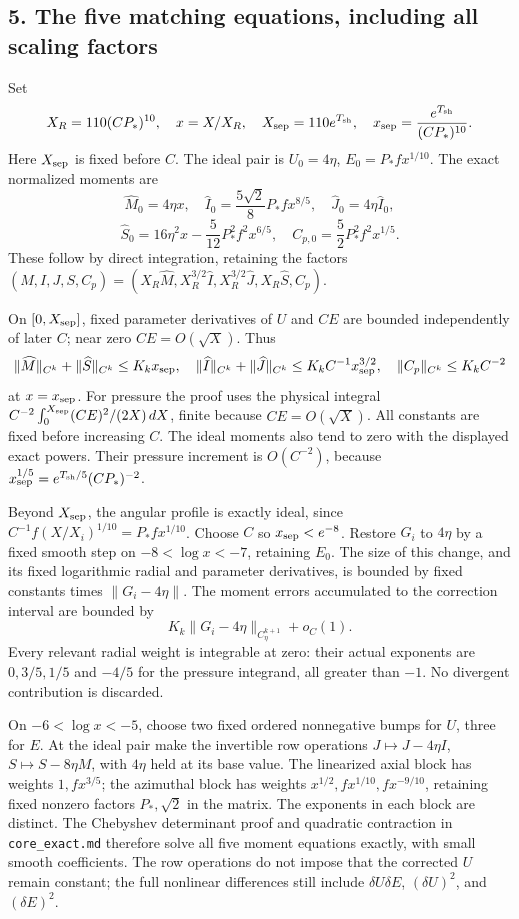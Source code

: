 \documentclass[10pt,a4paper]{article}
\begin{document}
\subsection{5. The five matching equations, including all scaling factors}

Set
\[
X_R=110(CP_*)^{10},\quad x=X/X_R,\quad
X_{\rm sep}=110e^{T_{\rm sh}},\quad
x_{\rm sep}=\frac{e^{T_{\rm sh}}}{(CP_*)^{10}}.
\]
Here \(X_{\rm sep}\) is fixed before \(C\). The ideal pair is \(U_0=4\eta\), \(E_0=P_*fx^{1/10}\). The exact normalized moments are
\[
\widehat M_0=4\eta x,\quad\widehat I_0=\frac{5\sqrt2}{8}P_*fx^{8/5},
\quad\widehat J_0=4\eta\widehat I_0,
\]
\[
\widehat S_0=16\eta^2x-\frac5{12}P_*^2f^2x^{6/5},
\quad C_{p,0}=\frac52P_*^2f^2x^{1/5}.
\]
These follow by direct integration, retaining the factors
\((M,I,J,S,C_p)=(X_R\widehat M,X_R^{3/2}\widehat I,
X_R^{3/2}\widehat J,X_R\widehat S,C_p)\).

On \([0,X_{\rm sep}]\), fixed parameter derivatives of \(U\) and \(CE\) are bounded independently of later \(C\); near zero \(CE=O(\sqrt X)\). Thus
\[
\|\widehat M\|_{C^k}+\|\widehat S\|_{C^k}\le K_kx_{\rm sep},
\quad\|\widehat I\|_{C^k}+\|\widehat J\|_{C^k}
\le K_kC^{-1}x_{\rm sep}^{3/2},
\quad\|C_p\|_{C^k}\le K_kC^{-2}
\]
at \(x=x_{\rm sep}\). For pressure the proof uses the physical integral \(C^{-2}\int_0^{X_{\rm sep}}(CE)^2/(2X)\,dX\), finite because \(CE=O(\sqrt X)\). All constants are fixed before increasing \(C\). The ideal moments also tend to zero with the displayed exact powers. Their pressure increment is \(O(C^{-2})\), because \(x_{\rm sep}^{1/5}=e^{T_{\rm sh}/5}(CP_*)^{-2}\).

Beyond \(X_{\rm sep}\), the angular profile is exactly ideal, since
\(C^{-1}f(X/X_i)^{1/10}=P_*fx^{1/10}\). Choose \(C\) so \(x_{\rm sep}<e^{-8}\). Restore \(G_i\) to \(4\eta\) by a fixed smooth step on \(-8<\log x<-7\), retaining \(E_0\). The size of this change, and its fixed logarithmic radial and parameter derivatives, is bounded by fixed constants times \(\|G_i-4\eta\|\). The moment errors accumulated to the correction interval are bounded by
\[
K_k\|G_i-4\eta\|_{C^{k+1}_\eta}+o_C(1).
\]
Every relevant radial weight is integrable at zero: their actual exponents are \(0,3/5,1/5\) and \(-4/5\) for the pressure integrand, all greater than \(-1\). No divergent contribution is discarded.

On \(-6<\log x<-5\), choose two fixed ordered nonnegative bumps for \(U\), three for \(E\). At the ideal pair make the invertible row operations \(J\mapsto J-4\eta I\), \(S\mapsto S-8\eta M\), with \(4\eta\) held at its base value. The linearized axial block has weights \(1,fx^{3/5}\); the azimuthal block has weights \(x^{1/2},fx^{1/10},fx^{-9/10}\), retaining fixed nonzero factors \(P_*,\sqrt2\) in the matrix. The exponents in each block are distinct. The Chebyshev determinant proof and quadratic contraction in \texttt{core\_exact.md} therefore solve all five moment equations exactly, with small smooth coefficients. The row operations do not impose that the corrected \(U\) remain constant; the full nonlinear differences still include \(\delta U\delta E\), \((\delta U)^2\), and \((\delta E)^2\).
\end{document}
